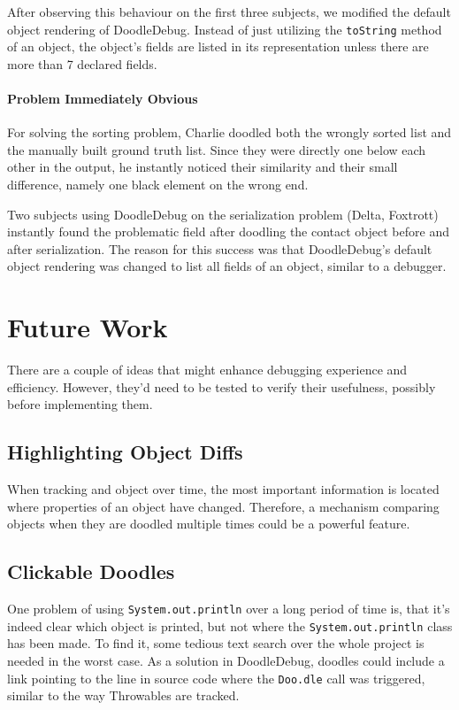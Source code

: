 \documentclass[english]{scrartcl}
\newcommand{\DD}{Dood\-le\-De\-bug\xspace}
\newcommand{\Doodle}{\texttt{Doo.\-dle}\xspace}
\newcommand{\println}{\texttt{Sys\-tem.\-out.\-println}\xspace}
\begin{document}
After observing this behaviour on the first three subjects, we modified the default object rendering of \DD.
Instead of just utilizing the \texttt{toString} method of an object, the object's fields are listed in its representation unless there are more than 7 declared fields.

\paragraph{Problem Immediately Obvious}
For solving the sorting problem, Charlie doodled both the wrongly sorted list and the manually built ground truth list.
Since they were directly one below each other in the output, he instantly noticed their similarity and their small difference, namely one black element on the wrong end.

Two subjects using \DD on the serialization problem (Delta, Foxtrott) instantly found the problematic field after doodling the contact object before and after serialization.
The reason for this success was that \DD's default object rendering was changed to list all fields of an object, similar to a debugger.


\section{Future Work}
There are a couple of ideas that might enhance debugging experience and efficiency.
However, they'd need to be tested to verify their usefulness, possibly before implementing them.

\subsection{Highlighting Object Diffs}
When tracking and object over time, the most important information is located where properties of an object have changed.
Therefore, a mechanism comparing objects when they are doodled multiple times could be a powerful feature.

\subsection{Clickable Doodles}
One problem of using \println over a long period of time is, that it's indeed clear which object is printed, but not where the \println class has been made.
To find it, some tedious text search over the whole project is needed in the worst case.
As a solution in \DD, doodles could include a link pointing to the line in source code where the \Doodle call was triggered, similar to the way Throwables are tracked.
\end{document}
